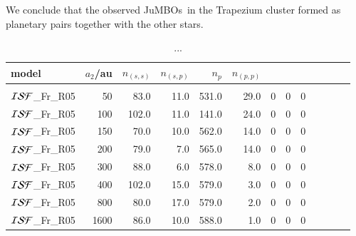 \documentclass[aa]{lib/aa}
\newcommand{\jumbos}{\mbox{JuMBOs}}
\begin{document}
We conclude that the observed \jumbos\, in the Trapezium cluster
formed as planetary pairs together with the other stars.

\begin{table}
 \caption{...}
 \label{Tab:model_PP}
 \centering 
 \begin{tabular}{lrrrrrrrrrrrr}
   \hline\hline
   model & $a_2$/au & $n_{(s,s)}$ & $n_{(s,p)}$ & $n_{p}$ & $n_{(p,p)}$ \\
        \hline \vspace{-0.75em}\\
${\cal ISF}$\_Fr\_R05 &  50 &  83.0 & 11.0 & 531.0 & 29.0 & 0 & 0 & 0 \\
${\cal ISF}$\_Fr\_R05 & 100 & 102.0 & 11.0 & 141.0 & 24.0 & 0 & 0 & 0 \\
${\cal ISF}$\_Fr\_R05 & 150 &  70.0 & 10.0 & 562.0 & 14.0 & 0 & 0 & 0 \\
${\cal ISF}$\_Fr\_R05 & 200 &  79.0 &  7.0 & 565.0 & 14.0 & 0 & 0 & 0 \\
${\cal ISF}$\_Fr\_R05 & 300 &  88.0 &  6.0 & 578.0 & 8.0 & 0 & 0 & 0 \\
${\cal ISF}$\_Fr\_R05 & 400 & 102.0 & 15.0 & 579.0 & 3.0 & 0 & 0 & 0 \\
${\cal ISF}$\_Fr\_R05 & 800 &  80.0 & 17.0 & 579.0 & 2.0 & 0 & 0 & 0 \\
${\cal ISF}$\_Fr\_R05 &1600 &  86.0 & 10.0 & 588.0 & 1.0 & 0 & 0 & 0 \\
\end{tabular}
\end{table}
\end{document}
